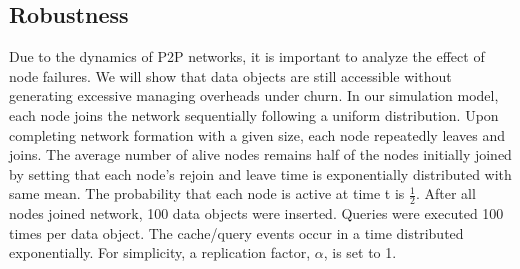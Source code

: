 \documentclass[conference]{IEEEtran}
\begin{document}
\subsection{Robustness}
Due to the dynamics of P2P networks,
it is important to analyze the effect of node failures.
We will show that data objects are still accessible without generating 
excessive managing overheads under churn.
In our simulation model, each node joins the network sequentially
following a uniform distribution.
Upon completing network formation with a given size, each node repeatedly 
leaves and joins.
The average number of alive nodes remains half of the nodes initially joined
by setting that each node's rejoin and leave time is exponentially distributed
with same mean.
%
The probability that each node is active at time t is $\frac{1}{2}$.
After all nodes joined network, 100 data objects were inserted.
Queries were executed 100 times per data object. 
The cache/query events occur 
in a time distributed exponentially.
For simplicity, a replication factor, $\alpha$, is set to 1.
\end{document}
